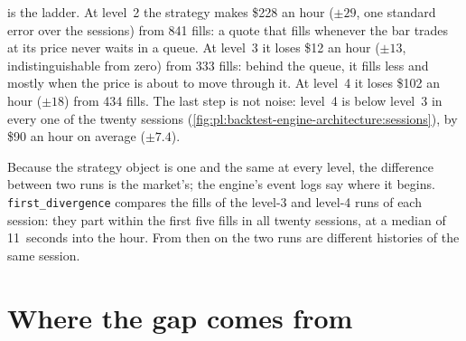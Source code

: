 is the ladder. At level~2 the strategy makes \$228 an hour ($\pm 29$, one standard
error over the sessions) from 841 fills: a quote that fills whenever the bar trades at its price never waits in a queue. At level~3 it
loses \$12 an hour ($\pm 13$, indistinguishable from zero) from 333 fills: behind the queue, it fills less and mostly when the price is
about to move through it. At level~4 it loses \$102 an hour ($\pm 18$) from 434 fills. The last step is not noise: level~4 is below
level~3 in every one of the twenty sessions (\cref{fig:pl:backtest-engine-architecture:sessions}), by \$90 an hour on average ($\pm 7.4$).

\begin{omfigure}

\label{fig:pl:backtest-engine-architecture:sessions}
\end{omfigure}

Because the strategy object is one and the same at every level, the difference between two runs is the market's; the engine's event
logs say where it begins. \texttt{first\_divergence} compares the fills of the level-3 and level-4 runs of each session: they part within
the first five fills in all twenty sessions, at a median of 11~seconds into the hour. From then on the two runs are different histories of
the same session.

\section{Where the gap comes from}

